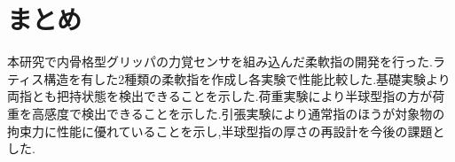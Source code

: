\section{まとめ}
本研究で内骨格型グリッパの力覚センサを組み込んだ柔軟指の開発を行った.ラティス構造を有した2種類の柔軟指を作成し各実験で性能比較した.基礎実験より両指とも把持状態を検出できることを示した.荷重実験により半球型指の方が荷重を高感度で検出できることを示した.引張実験により通常指のほうが対象物の拘束力に性能に優れていることを示し,半球型指の厚さの再設計を今後の課題とした.